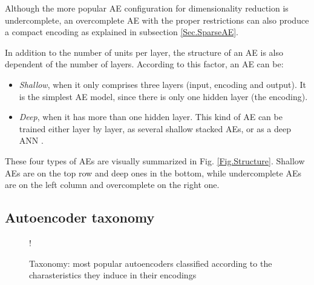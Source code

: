 \documentclass[preprint,5p,compress]{elsarticle}
\begin{document}
Although the more popular AE configuration for dimensionality reduction is undercomplete, an overcomplete AE with the proper restrictions can also produce a compact encoding as explained in subsection \ref{Sec.SparseAE}.

In addition to the number of units per layer, the structure of an AE is also dependent of the number of layers. According to this factor, an AE can be:

\begin{itemize}
	\item \textit{Shallow}, when it only comprises three layers (input, encoding and output). It is the simplest AE model, since there is only one hidden layer (the encoding).
	
	\item \textit{Deep}, when it has more than one hidden layer. This kind of AE can be trained either layer by layer, as several shallow stacked AEs, or as a deep ANN \cite{DeepTrainingStrategies}.
\end{itemize}

These four types of AEs are visually summarized in Fig. \ref{Fig.Structure}. Shallow AEs are on the top row and deep ones in the bottom, while undercomplete AEs are on the left column and overcomplete on the right one.


\subsection{Autoencoder taxonomy}

\begin{figure}[htp!]
	\centering
	 {!} {
		
	}
	\caption{Taxonomy: most popular autoencoders classified according to the charasteristics they induce in their encodings}
	\label{fig:autoencoder-taxonomy}
\end{figure}
\end{document}
